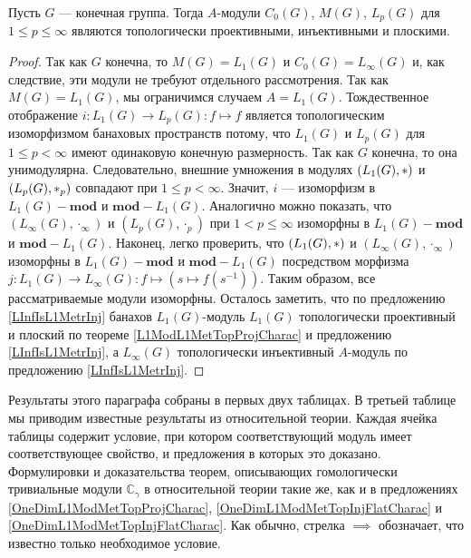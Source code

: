 \begin{proposition}\label{StdModFinGrL1MGTopInjProjFlatCharac} Пусть $G$ --- конечная группа. Тогда $A$-модули $C_0(G)$, $M(G)$, $L_p(G)$ для $1\leq p\leq \infty$ являются топологически проективными, инъективными и плоскими.
\end{proposition} 
\begin{proof}
Так как $G$ конечна, то $M(G)=L_1(G)$ и $C_0(G)=L_\infty(G)$ и, как следствие, эти модули не требуют отдельного рассмотрения. Так как $M(G)=L_1(G)$, мы ограничимся случаем $A=L_1(G)$. Тождественное отображение $i:L_1(G)\to L_p(G):f\mapsto f$ является топологическим изоморфизмом банаховых пространств потому, что $L_1(G)$ и $L_p(G)$ для $1\leq p<\infty$ имеют одинаковую конечную размерность. Так как $G$ конечна, то она унимодулярна. Следовательно, внешние умножения в модулях $(L_1(G),\ast)$ и $(L_p(G),\ast_p)$ совпадают при $1\leq p<\infty$. Значит, $i$ --- изоморфизм в $L_1(G)-\mathbf{mod}$ и $\mathbf{mod}-L_1(G)$. Аналогично можно показать, что $(L_\infty(G),\cdot_\infty)$ и $(L_p(G),\cdot_p)$ при $1<p\leq\infty$ изоморфны в $L_1(G)-\mathbf{mod}$ и $\mathbf{mod}-L_1(G)$. Наконец, легко проверить, что $(L_1(G),\ast)$ и $(L_\infty(G),\cdot_\infty)$ изоморфны в $L_1(G)-\mathbf{mod}$ и $\mathbf{mod}-L_1(G)$ посредством морфизма $j:L_1(G)\to L_\infty(G):f\mapsto(s\mapsto f(s^{-1}))$. Таким образом, все рассматриваемые модули изоморфны. Осталось заметить, что по предложению \ref{LInfIsL1MetrInj} банахов $L_1(G)$-модуль $L_1(G)$ топологически проективный и плоский по теореме \ref{L1ModL1MetTopProjCharac} и предложению \ref{LInfIsL1MetrInj}, а $L_\infty(G)$ топологически инъективный $A$-модуль по предложению \ref{LInfIsL1MetrInj}.
\end{proof}

Результаты этого параграфа собраны в первых двух таблицах. В третьей таблице мы приводим известные результаты из относительной теории. Каждая ячейка таблицы содержит условие, при котором соответствующий модуль имеет соответствующее свойство, и предложения в которых это доказано. Формулировки и доказательства теорем, описывающих гомологически тривиальные модули $\mathbb{C}_\gamma$ в относительной теории такие же, как и в предложениях \ref{OneDimL1ModMetTopProjCharac}, \ref{OneDimL1ModMetTopInjFlatCharac} и \ref{OneDimL1ModMetTopInjFlatCharac}. Как обычно, стрелка $\implies$ обозначает, что известно только необходимое условие. 

